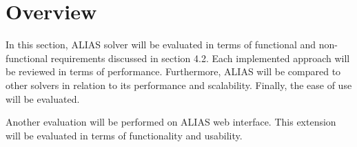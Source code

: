 \section{Overview}
In this section, ALIAS solver will be evaluated in terms of functional and non-functional requirements discussed in section 4.2. Each implemented approach will be reviewed in terms of performance. Furthermore, ALIAS will be compared to other solvers in relation to its performance and scalability. Finally, the ease of use will be evaluated.

Another evaluation will be performed on ALIAS web interface. This extension will be evaluated in terms of functionality and usability. 